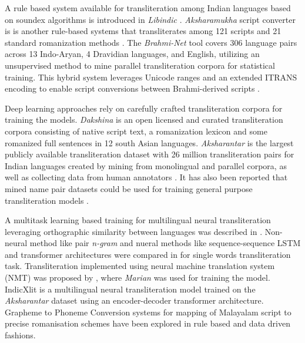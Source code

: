 \documentclass[11pt]{article}
\begin{document}
A rule based system available for transliteration among Indian languages based on soundex algorithms is introduced in \textit{Libindic} \cite{libindic}. \textit{Aksharamukha} script converter is is another rule-based systems that transliterates among 121 scripts and 21 standard romanization methods \cite{aksharamukha}. The \textit{Brahmi-Net} tool covers 306 language pairs across 13 Indo-Aryan, 4 Dravidian languages, and English, utilizing an unsupervised method to mine parallel transliteration corpora for statistical training. This hybrid system leverages Unicode ranges and an extended ITRANS encoding to enable script conversions between Brahmi-derived scripts \cite{kunchukuttan-etal-2015-brahmi}.

Deep learning approaches rely on carefully crafted transliteration corpora for training the models. \textit{Dakshina} is an open licensed and curated transliteration corpora \cite{roark-etal-2020-processing} consisting of native script text, a romanization lexicon and some romanized full sentences in 12 south Asian languages. \textit{Aksharantar} is the largest publicly available transliteration dataset with 26 million transliteration pairs for Indian languages created by mining from  monolingual and parallel corpora, as well as collecting data from human annotators \cite{kunchukuttan-etal-2021-large,madhani-etal-2023-aksharantar}. It has also been reported that mined name pair datasets \cite{namepair} could be used for training general purpose transliteration models \cite{Baiju2024}. 

A multitask learning based training for multilingual neural transliteration leveraging orthographic similarity between languages was described in \cite{kunchukuttan2018leveraging}. Non-neural method like pair \textit{n-gram} and nueral methods like sequence-sequence LSTM  and transformer architectures were compared in \citeauthor{roark-etal-2020-processing} for single words transliteration task.
Transliteration implemented using neural machine translation system (NMT) was proposed by \citeauthor{kunchukuttan-etal-2021-large}, where \textit{Marian} \cite{junczys-dowmunt-etal-2018-marian} was used for training the model. IndicXlit is a multilingual neural transliteration model trained on the  \textit{Aksharantar} \cite{madhani-etal-2023-aksharantar} dataset using an encoder-decoder transformer architecture. Grapheme to Phoneme Conversion systems for mapping of Malayalam script to precise romanisation schemes have been explored in rule based \cite{baby2016resources,parlikar2016festvox, manghat2020malayalam} and data driven \cite{Priyamvada_2021} fashions.
\end{document}

